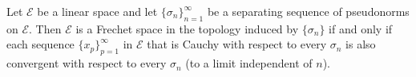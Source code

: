 Let $\mathcal{E}$ be a linear space and let $\{\sigma_n\}_{n=1}^{\infty}$ be a separating sequence of pseudonorms on $\mathcal{E}$. Then $\mathcal{E}$ is a Frechet space in the topology induced by $\{\sigma_n\}$ if and only if each sequence $\{x_p\}_{p=1}^{\infty}$ in $\mathcal{E}$ that is Cauchy with respect to every $\sigma_n$ is also convergent with respect to every $\sigma_n$ (to a limit independent of $n$).
